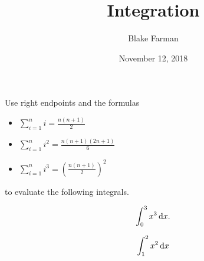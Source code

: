 \documentclass[10pt]{amsart}
\title{Integration}
\date{November 12, 2018}
\author{Blake Farman}
\begin{document}
\maketitle

\makenameslot

\noindent
Use right endpoints and the formulas
\begin{itemize}
\item
  \(\displaystyle{\sum_{i = 1}^n i = \frac{n(n+1)}{2}}\)
\item
  \(\displaystyle{\sum_{i = 1}^n i^2 = \frac{n(n+1)(2n+1)}{6}}\)
\item
  \(\displaystyle{\sum_{i = 1}^n i^3 = \left(\frac{n(n+1)}{2}\right)^2}\)
\end{itemize}
to evaluate the following integrals.

\begin{thm}
  \[\int_0^3 x^3 \dif x.\]
\end{thm}

\newpage

\begin{thm}
  \[\int_1^2 x^2 \dif x\]
\end{thm}
\end{document}
